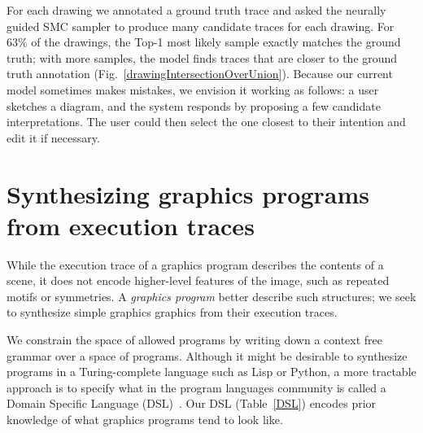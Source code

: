 \documentclass{article}
\begin{document}
For each drawing we annotated a ground truth trace and asked the neurally guided SMC sampler
to produce many candidate traces for each drawing.
For 63\% of the drawings, the Top-1 most likely sample exactly matches the
ground truth; with more samples, the model finds traces
that are closer to the ground truth annotation (Fig.~\ref{drawingIntersectionOverUnion}).
Because our current model sometimes makes mistakes, %
we envision it working as follows:
a user sketches a diagram,
and the system responds by proposing a few candidate interpretations.
The user could then select the one closest to their intention and edit it if necessary.

\section{Synthesizing graphics programs from execution traces}\label{programSynthesisSection}
While the execution trace of a graphics program describes the contents
of a scene, it does not encode higher-level features of the image,
such as repeated motifs or symmetries.  A \emph{graphics
  program} better describe such structures;
we seek to synthesize simple graphics graphics from their execution traces.

We constrain the space of allowed programs by writing down a context
free grammar over a space of programs. Although it might be desirable
to synthesize programs in a Turing-complete language such as Lisp or
Python, a more tractable approach is to specify what in the program
languages community is called a Domain Specific Language (DSL)~\cite{polozov2015flashmeta}. Our DSL (Table~\ref{DSL})
encodes prior knowledge of what graphics programs tend to look like.
\end{document}

